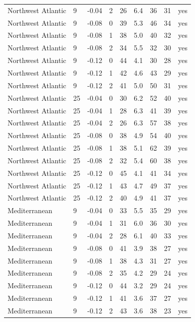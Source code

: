 {\begin{longtable}{llrrrrrrl}
Northwest Atlantic &  9 & -0.04 & 2 & 26 & 6.4 & 36 & 31 & yes \\
Northwest Atlantic &  9 & -0.08 & 0 & 39 & 5.3 & 46 & 34 & yes \\
Northwest Atlantic &  9 & -0.08 & 1 & 38 & 5.0 & 40 & 32 & yes \\
Northwest Atlantic &  9 & -0.08 & 2 & 34 & 5.5 & 32 & 30 & yes \\
Northwest Atlantic &  9 & -0.12 & 0 & 44 & 4.1 & 30 & 28 & yes \\
Northwest Atlantic &  9 & -0.12 & 1 & 42 & 4.6 & 43 & 29 & yes \\
Northwest Atlantic &  9 & -0.12 & 2 & 41 & 5.0 & 50 & 31 & yes \\
Northwest Atlantic & 25 & -0.04 & 0 & 30 & 6.2 & 52 & 40 & yes \\
Northwest Atlantic & 25 & -0.04 & 1 & 28 & 6.3 & 41 & 39 & yes \\
Northwest Atlantic & 25 & -0.04 & 2 & 26 & 6.3 & 57 & 38 & yes \\
Northwest Atlantic & 25 & -0.08 & 0 & 38 & 4.9 & 54 & 40 & yes \\
Northwest Atlantic & 25 & -0.08 & 1 & 38 & 5.1 & 62 & 39 & yes \\
Northwest Atlantic & 25 & -0.08 & 2 & 32 & 5.4 & 60 & 38 & yes \\
Northwest Atlantic & 25 & -0.12 & 0 & 45 & 4.1 & 41 & 34 & yes \\
Northwest Atlantic & 25 & -0.12 & 1 & 43 & 4.7 & 49 & 37 & yes \\
Northwest Atlantic & 25 & -0.12 & 2 & 40 & 4.9 & 41 & 37 & yes \\
Mediterranean &  9 & -0.04 & 0 & 33 & 5.5 & 35 & 29 & yes \\
Mediterranean &  9 & -0.04 & 1 & 31 & 6.0 & 36 & 30 & yes \\
Mediterranean &  9 & -0.04 & 2 & 28 & 6.1 & 40 & 33 & yes \\
Mediterranean &  9 & -0.08 & 0 & 41 & 3.9 & 38 & 27 & yes \\
Mediterranean &  9 & -0.08 & 1 & 38 & 4.3 & 31 & 27 & yes \\
Mediterranean &  9 & -0.08 & 2 & 35 & 4.2 & 29 & 24 & yes \\
Mediterranean &  9 & -0.12 & 0 & 44 & 3.2 & 29 & 24 & yes \\
Mediterranean &  9 & -0.12 & 1 & 41 & 3.6 & 37 & 27 & yes \\
Mediterranean &  9 & -0.12 & 2 & 43 & 3.6 & 38 & 23 & yes \\

\end{longtable}}
